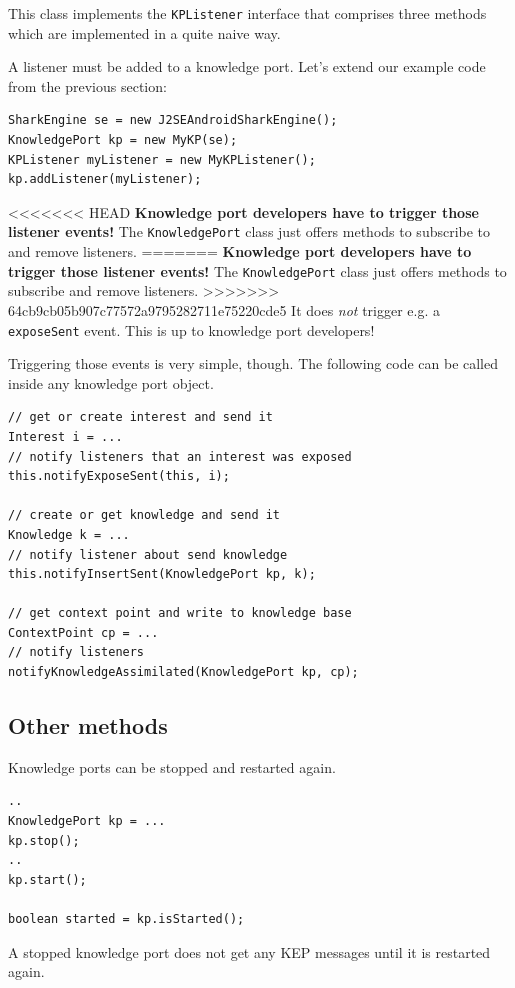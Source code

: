 This class implements the {\tt KPListener} interface that comprises three methods which are implemented in a quite naive way.

A listener must be added to a knowledge port. Let's extend our example code from the previous section:

\begin{verbatim}
SharkEngine se = new J2SEAndroidSharkEngine();
KnowledgePort kp = new MyKP(se);
KPListener myListener = new MyKPListener();
kp.addListener(myListener);
\end{verbatim}

<<<<<<< HEAD
{\bf Knowledge port developers have to trigger those listener events!} The {\tt KnowledgePort} class just offers methods to subscribe to and remove listeners.
=======
{\bf Knowledge port developers have to trigger those listener events!} The {\tt KnowledgePort} class just offers methods to subscribe and remove listeners.
>>>>>>> 64cb9cb05b907c77572a9795282711e75220cde5
It does {\it not} trigger e.g. a {\tt exposeSent} event. This is up to knowledge port developers!

Triggering those events is very simple, though. The following code can be called inside any knowledge port object.

\begin{verbatim}
// get or create interest and send it
Interest i = ...
// notify listeners that an interest was exposed
this.notifyExposeSent(this, i);

// create or get knowledge and send it
Knowledge k = ...
// notify listener about send knowledge
this.notifyInsertSent(KnowledgePort kp, k);

// get context point and write to knowledge base
ContextPoint cp = ...
// notify listeners
notifyKnowledgeAssimilated(KnowledgePort kp, cp);
\end{verbatim}

\subsection{Other methods}
Knowledge ports can be stopped and restarted again.

\begin{verbatim}
..
KnowledgePort kp = ...
kp.stop();
..
kp.start();

boolean started = kp.isStarted();
\end{verbatim}

A stopped knowledge port does not get any KEP messages until it is restarted again. 

